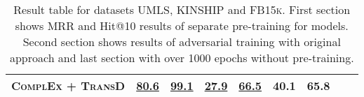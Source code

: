 \begin{table}[h]
\begin{tabular}{lllllllll}
        \textsc{ComplEx} + \textsc{TransD}
         & \underline{80.6}  
         & \underline{99.1} 
         & \underline{27.9}
         & \underline{66.5}
         & 40.1 
         & 65.8\\
        \bottomrule
    \end{tabular}
    \caption{Result table for datasets \textsc{UMLS}, \textsc{KINSHIP} and \textsc{FB15k}.
    First section shows MRR and Hit@10 results of separate pre-training for models.
    Second section shows results of adversarial training with original \kbgan approach and last section with \usgan over 1000 epochs without pre-training.}
\label{tab:results_small_datasets}
\end{table}